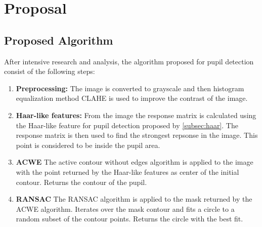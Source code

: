 \chapter{Proposal}
\label{chap:proposal}
\section{Proposed Algorithm}
After intensive research and analysis, the algorithm proposed for pupil detection consist of the following steps: 
\begin{enumerate}
    \item \textbf{Preprocessing:} The image is converted to grayscale and then histogram equalization method CLAHE is used to improve the contrast of the image.
    \item \textbf{Haar-like features:} From the image the response matrix is calculated using the Haar-like feature for pupil detection proposed by \ref{subsec:haar}. The response matrix is then used to find the strongest repsonse in the image. This point is considered to be inside the pupil area. 
    \item \textbf{ACWE} The active contour without edges algorithm is applied to the image with the point returned by the Haar-like features as center of the initial contour. Returns the contour of the pupil.
    \item \textbf{RANSAC} The RANSAC algorithm is applied to the mask returned by the ACWE algorithm. Iterates over the mask contour and fits a circle to a random subset of the contour points. Returns the circle with the best fit.
\end{enumerate}